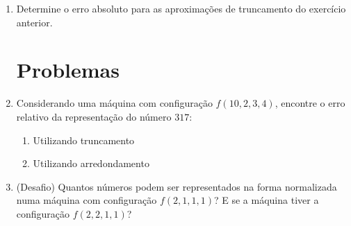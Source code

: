 \documentclass[a4paper]{article}
\begin{document}
\begin{enumerate}
\item Determine o erro absoluto para as aproximações de truncamento do
  exercício anterior.



  \section{Problemas}

  


\item Considerando uma máquina com configuração $f(10,2,3,4)$,
  encontre o erro relativo da representação do número $317$:
  \begin{enumerate}
  \item Utilizando truncamento %
  \item Utilizando arredondamento %
  \end{enumerate}
  
\item (Desafio) Quantos números podem ser representados na forma
  normalizada numa máquina com configuração $f(2,1,1,1)$? E se a
  máquina tiver a configuração $f(2,2,1,1)$?

\end{enumerate}
\end{document}
